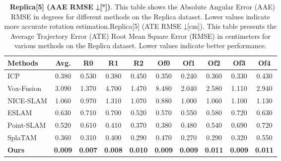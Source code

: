 \documentclass[twocolumn]{article} %
\begin{document}
\begin{table}[htbp]
\renewcommand{\thetable}{\textbf{\arabic{table}}}
\renewcommand{\tablename}{\textbf{Table}}
\centering
\caption{\textbf{ Replica[5] (AAE RMSE ↓[°])}. This table shows the Absolute Angular Error (AAE) RMSE in degrees for different methods on the Replica dataset. Lower values indicate more accurate rotation estimation.Replica[5] (ATE RMSE ↓[cm]). This table presents the Average Trajectory Error (ATE) Root Mean Square Error (RMSE) in centimeters for various methods on the Replica dataset. Lower values indicate better performance.}
\label{table:_textbf_replica_5_aa}
\begin{adjustbox}{max width=\columnwidth,max height=!,center}
\begin{tabular}{lccccccccc}
\toprule
\textbf{Methods} & \textbf{Avg.} & \textbf{R0} & \textbf{R1} & \textbf{R2} & \textbf{Of0} & \textbf{Of1} & \textbf{Of2} & \textbf{Of3} & \textbf{Of4}\\
\midrule
ICP & \cellcolor{lime!50}0.380 & \cellcolor{lime!50}0.530 & \cellcolor{yellow!30}0.380 & 0.450 & \cellcolor{yellow!30}0.350 & \cellcolor{yellow!30}0.240 & \cellcolor{lime!50}0.360 & \cellcolor{lime!50}0.330 & \cellcolor{yellow!30}0.430\\
Vox-Fusion & 3.090 & 1.370 & 4.700 & 1.470 & 8.480 & 2.040 & 2.580 & 1.110 & 2.940\\
NICE-SLAM & 1.060 & 0.970 & 1.310 & 1.070 & 0.880 & 1.000 & 1.060 & 1.100 & 1.130\\
ESLAM & 0.630 & 0.710 & 0.700 & 0.520 & 0.570 & 0.550 & 0.580 & 0.720 & 0.630\\
Point-SLAM & 0.520 & 0.610 & 0.410 & \cellcolor{lime!50}0.370 & \cellcolor{lime!50}0.380 & 0.480 & 0.540 & 0.690 & 0.720\\
SplaTAM & \cellcolor{yellow!30}0.360 & \cellcolor{yellow!30}0.310 & \cellcolor{lime!50}0.400 & \cellcolor{yellow!30}0.290 & 0.470 & \cellcolor{lime!50}0.270 & \cellcolor{yellow!30}0.290 & \cellcolor{yellow!30}0.320 & \cellcolor{lime!50}0.550\\
\midrule
\textbf{Ours} & \cellcolor{green!30}\textbf{0.009} & \cellcolor{green!30}\textbf{0.007} & \cellcolor{green!30}\textbf{0.008} & \cellcolor{green!30}\textbf{0.010} & \cellcolor{green!30}\textbf{0.009} & \cellcolor{green!30}\textbf{0.009} & \cellcolor{green!30}\textbf{0.011} & \cellcolor{green!30}\textbf{0.009} & \cellcolor{green!30}\textbf{0.011}\\
\bottomrule
\end{tabular}
\end{adjustbox}
\end{table}
\end{document}

